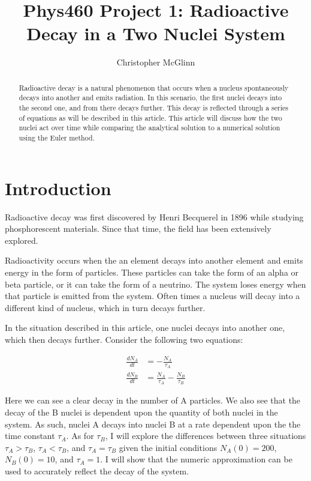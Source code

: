 \documentclass[pra,twocolumn,showpacs,amsmath,amssymb]{revtex4-2}
\begin{document}
\title{Phys460 Project 1: Radioactive Decay in a Two Nuclei System}


\author{Christopher McGlinn}

\begin{abstract}
Radioactive decay is a natural phenomenon that occurs when a nucleus spontaneously decays into another and emits radiation. In this scenario, the first nuclei decays into the second one, and from there decays further. This decay is reflected through a series of equations as will be described in this article. This article will discuss how the two nuclei act over time while comparing the analytical solution to a numerical solution using the Euler method.
\end{abstract}



\maketitle

\section{Introduction} \label{sec:intro}

Radioactive decay was first discovered by Henri Becquerel in 1896 while studying phosphorescent materials. Since that time, the field has been extensively explored.

\par Radioactivity occurs when the an element decays into another element and emits energy in the form of particles. These particles can take the form of an alpha or beta particle, or it can take the form of a neutrino. The system loses energy when that particle is emitted from the system. Often times a nucleus will decay into a different kind of nucleus, which in turn decays further.

\par In the situation described in this article, one nuclei decays into another one, which then decays further. Consider the following two equations:

\begin{align}
\frac{dN_A}{dt} &= -\frac{N_A}{\tau_A}\\
\frac{dN_B}{dt} &= \frac{N_A}{\tau_A} - \frac{N_B}{\tau_B}
\end{align}

\par Here we can see a clear decay in the number of A particles. We also see that the decay of the B nuclei is dependent upon the quantity of both nuclei in the system. As such, nuclei A decays into nuclei B at a rate dependent upon the the time constant \(\tau_{A}\). As for \(\tau_{B}\), I will explore the differences between three situations \(\tau_A > \tau_B\), \(\tau_A < \tau_B\), and \(\tau_A = \tau_B\) given the initial conditions \(N_A(0) = 200\), \(N_B(0) = 10\), and \(\tau_A = 1\). I will show that the numeric approximation can be used to accurately reflect the decay of the system.
\end{document}
